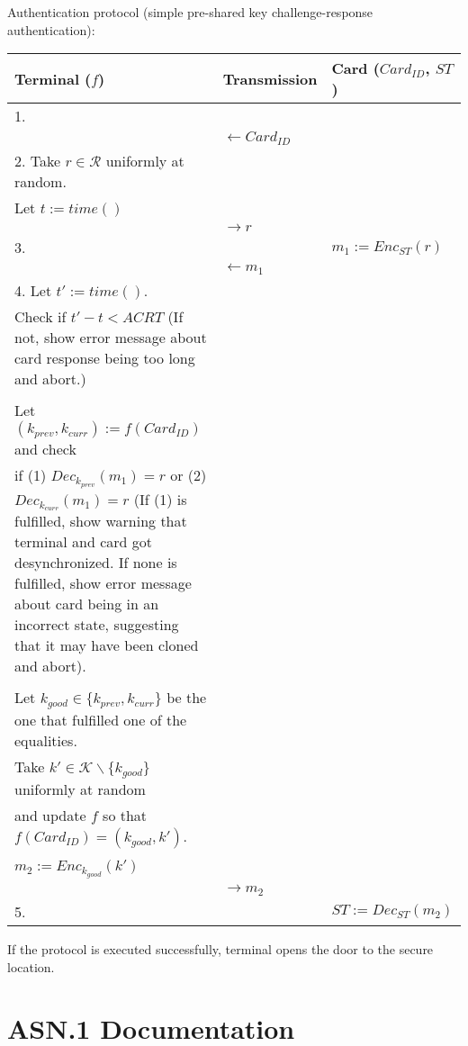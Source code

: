 \documentclass[10pt,titlepage]{article}
\begin{document}
Authentication protocol (simple pre-shared key challenge-response authentication):
 \begin{table}[!htdp]
 \centering
	\begin{tabular}{| p{6.55cm}   p{2.55cm}  p{4.55cm}| }
 \hline
 Terminal ($f$) & Transmission  & Card ($Card_{ID}$, $ST$) \\\hline
 1.  & & \\
 &  $\leftarrow Card_{ID}$  & \\
 2. Take $ r \in \mathcal{R} $ uniformly at random. &&\\
Let $t := time()$ &&  \\
 & $\rightarrow r$ &  \\
 3.& &$m_1 := Enc_{ST} (r)$ \\
 &  $\leftarrow m_1$  & \\
4. Let $t' := time()$. &&\\
Check if $t' - t < ACRT$ (If not, show error message about card response being too long and abort.) &&\\
&&\\
Let $(k_{prev}, k_{curr}) := f(Card_{ID})$ and check &&\\
if (1) $Dec_{k_{prev}}(m_1) = r$ or (2) $Dec_{k_{curr}}(m_1) = r$  (If (1) is fulfilled, show warning that terminal and card got desynchronized. If none is fulfilled, show error message about card being in an incorrect state, suggesting that it may have been cloned and abort).&&\\
&&\\
Let $k_{good} \in \{k_{prev}, k_{curr}\}$ be the one that fulfilled one of the equalities.&&\\
Take $k' \in \mathcal{K} \backslash \{k_{good}\} $ uniformly at random &&\\
and update $f$ so that $f(Card_{ID}) = (k_{good}, k')$.&&\\
&&\\
$m_2 := Enc_{k_{good}}(k')$& & \\
 & $\rightarrow m_2$ &  \\ 
5. & & $ ST := Dec_{ST} (m_2)$ \\
 \hline

 \end{tabular}
 \end{table}
 
If the protocol is executed successfully, terminal opens the door to the secure location.

\newpage

\section*{ASN.1 Documentation}
\end{document}
